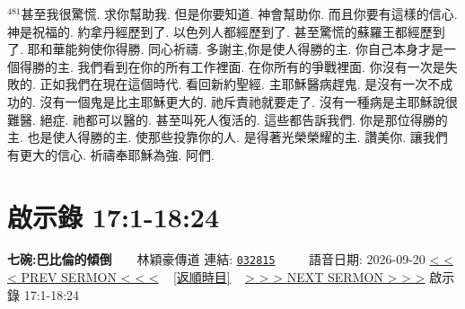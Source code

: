 \documentclass{book}
\begin{document}
$^{481}$甚至我很驚慌.
求你幫助我.
但是你要知道.
神會幫助你.
而且你要有這樣的信心.
神是祝福的.
約拿丹經歷到了.
以色列人都經歷到了.
甚至驚慌的蘇羅王都經歷到了.
耶和華能夠使你得勝.
同心祈禱.
多謝主,你是使人得勝的主.
你自己本身才是一個得勝的主.
我們看到在你的所有工作裡面.
在你所有的爭戰裡面.
你沒有一次是失敗的.
正如我們在現在這個時代.
看回新約聖經.
主耶穌醫病趕鬼.
是沒有一次不成功的.
沒有一個鬼是比主耶穌更大的.
祂斥責祂就要走了.
沒有一種病是主耶穌說很難醫.
絕症.
祂都可以醫的.
甚至叫死人復活的.
這些都告訴我們.
你是那位得勝的主.
也是使人得勝的主.
使那些投靠你的人.
是得著光榮榮耀的主.
讚美你.
讓我們有更大的信心.
祈禱奉耶穌為強.
阿們.
\newpage



\section{啟示錄 17:1-18:24}
\label{sec:032815}
\textbf{七碗:巴比倫的傾倒}~~~~林穎豪傳道
\newline
\newline
連結: \href{http://www.church.com.hk/acms/content.asp?site=cdc\&op=show\&type=product\&code=032815\&layout=sermon}{\texttt{032815}} ~~~~ 語音日期: 2026-09-20
\newline
\newline
\hyperref[sec:032814]{\small{< < < PREV SERMON < < <}}
~
\hyperref[sec:index_chronic]{\small{[返順時目]}}
~
\hyperref[sec:032816]{\small{> > > NEXT SERMON > > >}}
\newline
\newline
啟示錄 17:1-18:24
\newline
\end{document}
